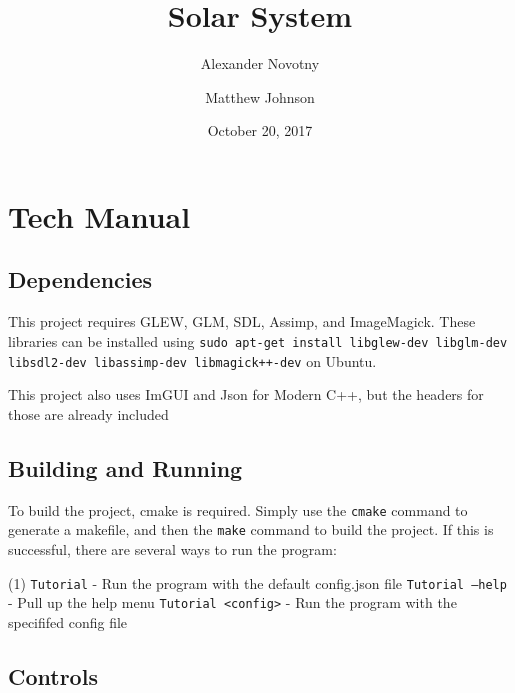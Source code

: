 \documentclass[twoside]{article}
\title{Solar System}
\date{October 20, 2017}
\author{Alexander Novotny \and Matthew Johnson}
\begin{document}
\maketitle

\newpage

\shipout\null

\tableofcontents

\newpage

\shipout\null


\section{Tech Manual}

\subsection{Dependencies}

This project requires GLEW, GLM, SDL, Assimp, and ImageMagick. These libraries can be installed using \texttt{sudo apt-get install libglew-dev libglm-dev libsdl2-dev libassimp-dev libmagick++-dev} on Ubuntu.

This project also uses ImGUI and Json for Modern C++, but the headers for those are already included

\subsection{Building and Running}

To build the project, cmake is required. Simply use the \texttt{cmake} command to generate a makefile, and then the \texttt{make} command to build the project. If this is successful, there are several ways to run the program:


\begin{tasks}[counter-format=\ ](1)
	\task \texttt{Tutorial} - Run the program with the default config.json file
	\task \texttt{Tutorial --help} - Pull up the help menu
	\task \texttt{Tutorial <config>} - Run the program with the specififed config file
\end{tasks}

\subsection{Controls}
\end{document}
